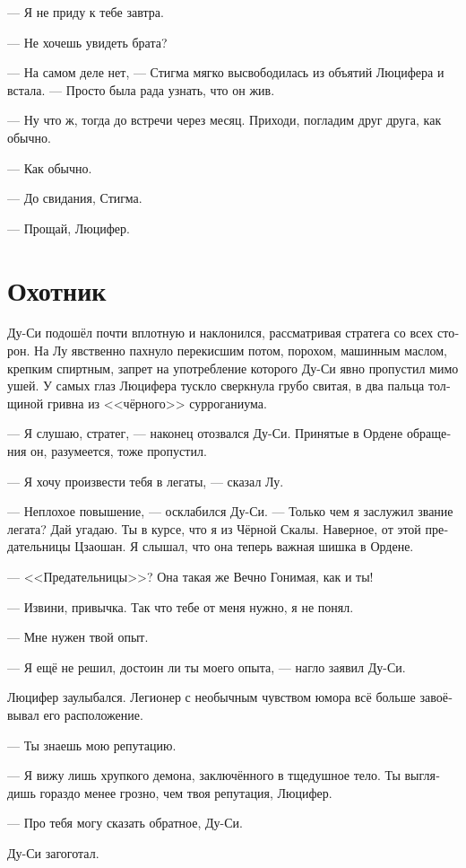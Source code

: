 \documentclass[a4paper,12pt,fleqn]{book}\usepackage{polyglossia}\setdefaultlanguage[babelshorthands=true]{russian}\setotherlanguage{english}\defaultfontfeatures{Ligatures=TeX,Mapping=tex-text}\usepackage{xcolor}\newcommand{\ml}[3]{#2}
\begin{document}
{--- Я не приду к тебе завтра.

--- Не хочешь увидеть брата?

--- На самом деле нет, --- Стигма мягко высвободилась из объятий Люцифера и встала.
--- Просто была рада узнать, что он жив.

--- Ну что ж, тогда до встречи через месяц.
Приходи, погладим друг друга, как обычно.

--- Как обычно.

--- До свидания, Стигма.

--- Прощай, Люцифер.

\section{Охотник}

Ду-Си подошёл почти вплотную и наклонился, рассматривая стратега со всех сторон.
На Лу явственно пахнуло перекисшим потом, порохом, машинным маслом, крепким спиртным, запрет на употребление которого Ду-Си явно пропустил мимо ушей.
У самых глаз Люцифера тускло сверкнула грубо свитая, в два пальца толщиной гривна из <<чёрного>> сурроганиума.

--- Я слушаю, стратег, --- наконец отозвался Ду-Си.
Принятые в Ордене обращения он, разумеется, тоже пропустил.

--- Я хочу произвести тебя в легаты, --- сказал Лу.

--- Неплохое повышение, --- осклабился Ду-Си.
--- Только чем я заслужил звание легата?
Дай угадаю.
Ты в курсе, что я из Чёрной Скалы.
Наверное, от этой предательницы Цзаошан.
Я слышал, что она теперь важная шишка в Ордене.

--- <<Предательницы>>?
Она такая же Вечно Гонимая, как и ты!

--- Извини, привычка.
Так что тебе от меня нужно, я не понял.

--- Мне нужен твой опыт.

--- Я ещё не решил, достоин ли ты моего опыта, --- нагло заявил Ду-Си.

Люцифер заулыбался.
Легионер с необычным чувством юмора всё больше завоёвывал его расположение.

--- Ты знаешь мою репутацию.

--- Я вижу лишь хрупкого демона, заключённого в тщедушное тело.
Ты выглядишь гораздо менее грозно, чем твоя репутация, Люцифер.

--- Про тебя могу сказать обратное, Ду-Си.

Ду-Си загоготал.

}
\end{document}
